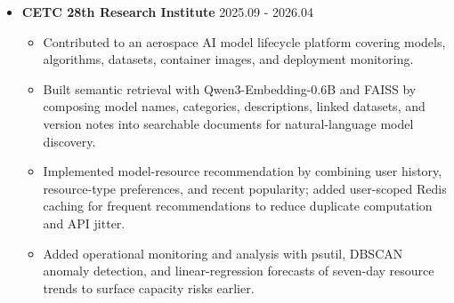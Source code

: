\documentclass{resume}
\begin{document}
\begin{itemize}
  \item \textbf{CETC 28th Research Institute} \hfill 2025.09 - 2026.04
  \begin{itemize}
    \item Contributed to an aerospace AI model lifecycle platform covering models, algorithms, datasets, container images, and deployment monitoring.
    \item Built semantic retrieval with Qwen3-Embedding-0.6B and FAISS by composing model names, categories, descriptions, linked datasets, and version notes into searchable documents for natural-language model discovery.
    \item Implemented model-resource recommendation by combining user history, resource-type preferences, and recent popularity; added user-scoped Redis caching for frequent recommendations to reduce duplicate computation and API jitter.
    \item Added operational monitoring and analysis with psutil, DBSCAN anomaly detection, and linear-regression forecasts of seven-day resource trends to surface capacity risks earlier.
  \end{itemize}


\end{itemize}
\end{document}
